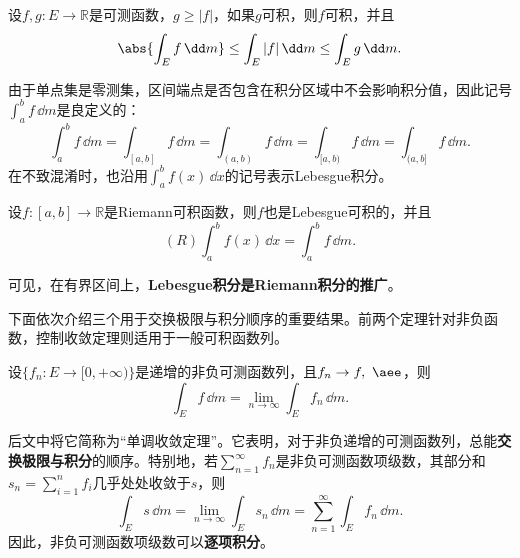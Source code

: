 \begin{theorem}[比较判别法]
    设$f,g:E\to\mathbb{R}$是可测函数，$g\geq|f|$，如果$g$可积，则$f$可积，并且
    \begin{equation}
        \abs{\int_{E}f\,\dd m}\leq \int_{E}|f|\,\dd m\leq \int_{E}g\,\dd m.
    \end{equation}
\end{theorem}

由于单点集是零测集，区间端点是否包含在积分区域中不会影响积分值，因此记号$\int_{a}^{b}f\,\dd m$是良定义的：
\begin{equation}
    \int_{a}^{b}f\,\dd m=\int_{[a,b]}f\,\dd m=\int_{(a,b)}f\,\dd m=\int_{[a,b)}f\,\dd m=\int_{(a,b]}f\,\dd m.
\end{equation}
在不致混淆时，也沿用$\int_{a}^{b}f(x)\,\dd x$的记号表示Lebesgue积分。

\begin{theorem}
    设$f:[a,b]\to\mathbb{R}$是Riemann可积函数，则$f$也是Lebesgue可积的，并且
    \begin{equation}
        (R)\int_{a}^{b}f(x)\,\dd x=\int_{a}^{b}f\,\dd m.
    \end{equation}
\end{theorem}

可见，在有界区间上，\textbf{Lebesgue积分是Riemann积分的推广}。

下面依次介绍三个用于交换极限与积分顺序的重要结果。前两个定理针对非负函数，控制收敛定理则适用于一般可积函数列。

\begin{theorem}[Levi单调收敛定理]\label{thm:MCT}
    设$\{f_n:E\to[0,+\infty)\}$是递增的非负可测函数列，且$f_n\to f,\ \aee$，则
    \begin{equation}
        \int_{E}f\,\dd m=\lim_{n\to\infty}\int_{E}f_n\,\dd m.
    \end{equation}
\end{theorem}
后文中将它简称为“单调收敛定理”。它表明，对于非负递增的可测函数列，总能\textbf{交换极限与积分}的顺序。特别地，若$\sum_{n=1}^{\infty}f_n$是非负可测函数项级数，其部分和$s_n=\sum_{i=1}^{n}f_i$几乎处处收敛于$s$，则
\begin{equation}
    \int_{E}s\,\dd m=\lim_{n\to\infty}\int_{E}s_n\,\dd m=\sum_{n=1}^{\infty}\int_{E}f_n\,\dd m.
\end{equation}
因此，非负可测函数项级数可以\textbf{逐项积分}。

